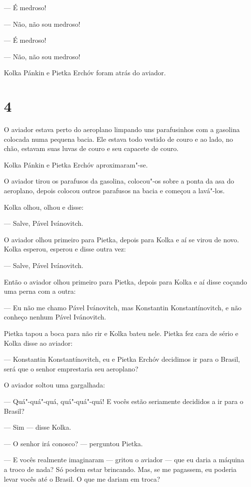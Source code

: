 --- É medroso!

--- Não, não sou medroso!

--- É medroso!

--- Não, não sou medroso!

Kolka Pánkin e Pietka Erchóv foram atrás do aviador.

\section{4}

O aviador estava perto do aeroplano limpando uns parafusinhos com a
gasolina colocada numa pequena bacia. Ele estava todo vestido de couro
e ao lado, no chão, estavam suas luvas de couro e seu capacete de couro.

Kolka Pánkin e Pietka Erchóv aproximaram"-se.

O aviador tirou os parafusos da gasolina, colocou"-os sobre a ponta da
asa do aeroplano, depois colocou outros parafusos na bacia e começou a
lavá"-los.

Kolka olhou, olhou e disse:

--- Salve, Pável Ivánovitch.

O aviador olhou primeiro para Pietka, depois para Kolka e aí se virou de
novo. Kolka esperou, esperou e disse outra vez:

--- Salve, Pável Ivánovitch.

Então o aviador olhou primeiro para Pietka, depois para Kolka e aí disse
coçando uma perna com a outra:

--- Eu não me chamo Pável Ivánovitch, mas Konstantin Konstantínovitch, e
não conheço nenhum Pável Ivánovitch.

Pietka tapou a boca para não rir e Kolka bateu nele. Pietka fez cara de
sério e Kolka disse ao aviador:

--- Konstantin Konstantínovitch, eu e Pietka Erchóv decidimos ir para o
Brasil, será que o senhor emprestaria seu aeroplano?

O aviador soltou uma gargalhada:

--- Quá"-quá"-quá, quá"-quá"-quá! E vocês estão seriamente decididos a ir
para o Brasil?

--- Sim --- disse Kolka.

--- O senhor irá conosco? --- perguntou Pietka.

--- E vocês realmente imaginaram --- gritou o aviador --- que eu daria a
máquina a troco de nada? Só podem estar brincando. Mas, se me pagassem,
eu poderia levar vocês até o Brasil. O que me dariam em troca?

